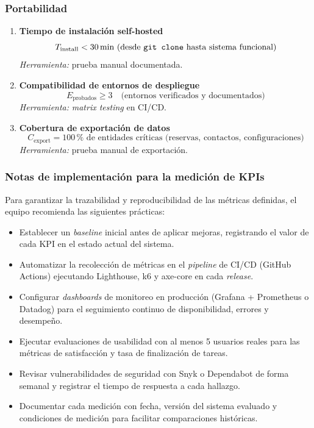 \documentclass[12pt, a4paper]{article}
\begin{document}
\subsubsection*{Portabilidad}

\begin{enumerate}[leftmargin=*, label=\textbf{KPI \arabic*.}, start=25]

    \item \textbf{Tiempo de instalación self-hosted}
    \[
        T_{\text{install}} < 30\,\text{min (desde \texttt{git clone} hasta sistema funcional)}
    \]
    \textit{Herramienta:} prueba manual documentada.

    \item \textbf{Compatibilidad de entornos de despliegue}
    \[
        E_{\text{probados}} \geq 3 \quad \text{(entornos verificados y documentados)}
    \]
    \textit{Herramienta:} \textit{matrix testing} en CI/CD.

    \item \textbf{Cobertura de exportación de datos}
    \[
        C_{\text{export}} = 100\,\% \text{ de entidades críticas (reservas, contactos, configuraciones)}
    \]
    \textit{Herramienta:} prueba manual de exportación.

\end{enumerate}

\subsubsection*{Notas de implementación para la medición de KPIs}

Para garantizar la trazabilidad y reproducibilidad de las métricas definidas, el equipo
recomienda las siguientes prácticas:

\begin{itemize}
    \item Establecer un \textit{baseline} inicial antes de aplicar mejoras, registrando el valor de cada KPI en el estado actual del sistema.
    \item Automatizar la recolección de métricas en el \textit{pipeline} de CI/CD (GitHub Actions) ejecutando Lighthouse, k6 y axe-core en cada \textit{release}.
    \item Configurar \textit{dashboards} de monitoreo en producción (Grafana + Prometheus o Datadog) para el seguimiento continuo de disponibilidad, errores y desempeño.
    \item Ejecutar evaluaciones de usabilidad con al menos 5 usuarios reales para las métricas de satisfacción y tasa de finalización de tareas.
    \item Revisar vulnerabilidades de seguridad con Snyk o Dependabot de forma semanal y registrar el tiempo de respuesta a cada hallazgo.
    \item Documentar cada medición con fecha, versión del sistema evaluado y condiciones de medición para facilitar comparaciones históricas.
\end{itemize}
\end{document}
